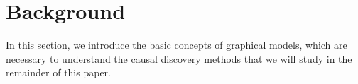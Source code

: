 \documentclass[11pt]{article}
\begin{document}







\section{Background}
In this section, we introduce the basic concepts of graphical models, which are necessary to understand the causal discovery methods that we will study in the remainder of this paper. 
\end{document}
